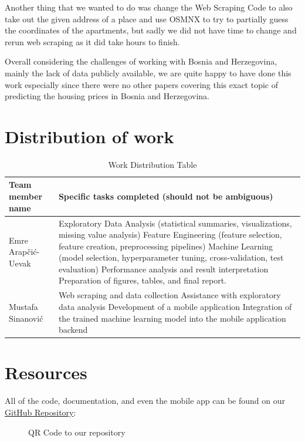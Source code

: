 \documentclass[11pt]{article}
\begin{document}
		\noindent Another thing that we wanted to do was change the Web Scraping Code to also take out the given address of a place and use OSMNX to try to partially guess the coordinates
		of the apartments, but sadly we did not have time to change and rerun web scraping as it did take hours to finish. \newline

		\noindent Overall considering the challenges of working with Bosnia and Herzegovina, mainly the lack of data publicly available, we are quite happy to have done this work
		especially since there were no other papers covering this exact topic of predicting the housing prices in Bosnia and Herzegovina.

	\section{Distribution of work}
	\begin{table}[H]
		\centering
		\renewcommand{\arraystretch}{1.3}
		\begin{tabularx}{\textwidth}{|l|X|}
			\hline
			\textbf{Team member name} & \textbf{Specific tasks completed (should not be ambiguous)} \\
			\hline
			Emre Arap\v{c}i\'{c}-Uevak &
			Exploratory Data Analysis (statistical summaries, visualizations, missing value analysis) \newline
			Feature Engineering (feature selection, feature creation, preprocessing pipelines) \newline
			Machine Learning (model selection, hyperparameter tuning, cross-validation, test evaluation) \newline
			Performance analysis and result interpretation \newline
			Preparation of figures, tables, and final report. \\
			\hline
			Mustafa Sinanovi\'{c} &
			Web scraping and data collection \newline
			Assistance with exploratory data analysis \newline
			Development of a mobile application \newline
			Integration of the trained machine learning model into the mobile application backend \\
			\hline
		\end{tabularx}
		\caption{Work Distribution Table}
		\label{tab:work dist}
	\end{table}

	\section{Resources}
		\noindent All of the code, documentation, and even the mobile app can be found on our \href{https://github.com/EmreArapcicUevak/EE418-Introduction-to-Machine-Learning-Project}{GitHub Repository}:
		\begin{figure}[h]
			\centering
			\caption{QR Code to our repository}
			\label{fig:qr repo}
		\end{figure}
\end{document}
